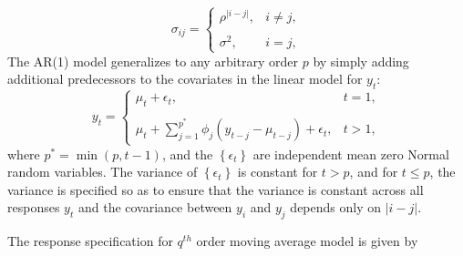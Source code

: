 \documentclass[../chapter-1-introduction.tex]{subfiles}
\begin{document}
\begin{equation}\label{eq:compound-symmetric-model}
\sigma_{ij} = \left\{ \begin{array}{lr}
\rho^{\vert i - j \vert}, & i \ne j,\\
& \\
\sigma^2, & i = j, 
\end{array}\right.
\end{equation}
\bigskip
\noindent
The AR(1) model generalizes to any arbitrary order $p$ by simply adding additional predecessors to the covariates in the linear model for $y_t$:
\begin{equation*}
y_{t} = \left\{ \begin{array}{lr}
\mu_t + \epsilon_t, & t = 1,\\
& \\
\mu_t + \sum\limits_{j = 1}^{p^*} \phi_j\left(y_{t-j} - \mu_{t-j}\right) + \epsilon_t, & t > 1,
\end{array}\right.
\end{equation*}
\noindent
where $p^* = \min\left(p,t-1\right)$, and the $\left\{\epsilon_t\right\}$ are independent mean zero Normal random variables. The variance of $\left\{\epsilon_t\right\}$ is constant for $t > p$, and for $t \le p$, the variance is specified so as to ensure that the variance is constant across all responses $y_t$ and the covariance between $y_i$ and $y_j$ depends only on $\vert i - j\vert$. 

\bigskip

The response specification for $q^{th}$ order moving average model  is given by 
\end{document}

